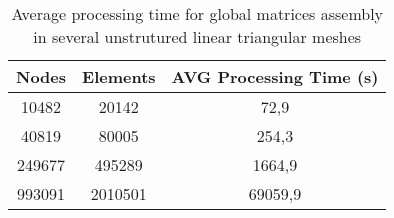 \vspace{0.5cm}
\begin{table}[H]
\centering
\begin{tabular}{ccc}
\toprule
\textbf{Nodes} & \textbf{Elements} & \textbf{AVG Processing Time} (s) \\
\midrule
10482 & 20142 & 72,9 \\
40819 & 80005 & 254,3 \\
249677 & 495289 & 1664,9 \\
993091 & 2010501 & 69059,9 \\

\bottomrule
\end{tabular}
\caption{Average processing time for global matrices assembly in several unstrutured linear triangular meshes}
\label{tempo matrizes globais}
\end{table}
 
